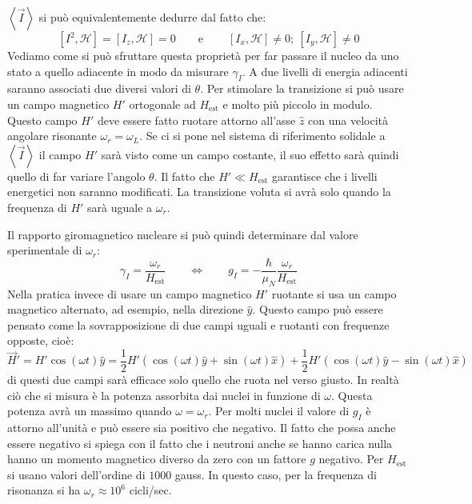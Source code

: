 $\left\langle \vec{I} \right\rangle$ si può equivalentemente dedurre dal fatto
che:
\begin{equation}
\left[ I^2, \mathcal{H} \right] = \left[ I_z, \mathcal{H} \right] = 0 \qquad \text{e}\ \qquad \left[ I_x, \mathcal{H} \right] \ne 0;\ \left[ I_y, \mathcal{H} \right] \ne 0
\end{equation}
Vediamo come si può sfruttare questa proprietà per far passare il nucleo da uno
stato a quello adiacente in modo da misurare $\gamma_I$. A due livelli di
energia adiacenti saranno associati due diversi valori di $\theta$. Per
stimolare la transizione si può usare un campo magnetico $H'$ ortogonale ad
$H_\text{est}$ e molto più piccolo in modulo. Questo campo $H'$ deve essere
fatto ruotare attorno all'asse $\hat{z}$ con una velocità angolare risonante
$\omega_r = \omega_L$. Se ci si pone nel sistema di riferimento solidale a
$\left\langle \vec{I} \right\rangle$ il campo $H'$ sarà visto come un campo
costante, il suo effetto sarà quindi quello di far variare l'angolo $\theta$. Il
fatto che $H' \ll H_\text{est}$ garantisce che i livelli energetici non saranno
modificati. La transizione voluta si avrà solo quando la frequenza di $H'$ sarà
uguale a $\omega_r$.

Il rapporto giromagnetico nucleare  si può quindi determinare dal valore
sperimentale di $\omega_r$:
\begin{equation}
\gamma_I = \frac{\omega_r}{H_\text{est}} \qquad \Leftrightarrow \qquad g_I = - \frac{\hbar}{\mu_N} \frac{\omega_r}{H_\text{est}}
\end{equation}
Nella pratica invece di usare un campo magnetico $H'$ ruotante si usa un campo
magnetico alternato, ad esempio, nella direzione $\hat{y}$. Questo campo può
essere pensato come la sovrapposizione di due campi uguali e ruotanti con
frequenze opposte, cioè:
\begin{equation}
\vec{H}' = H' \cos (\omega t) \hat{y} = \frac{1}{2} H' (\cos (\omega t) \hat{y} + \sin (\omega t) \hat{x} ) + \frac{1}{2} H' (\cos (\omega t) \hat{y} - \sin (\omega t) \hat{x} )
\end{equation}
di questi due campi sarà efficace solo quello che ruota nel verso giusto. In
realtà ciò che si misura è la potenza assorbita dai nuclei in funzione di
$\omega$. Questa potenza avrà un massimo quando $\omega = \omega_r$. Per molti
nuclei il valore di $g_I$ è attorno all'unità e può essere sia positivo che
negativo. Il fatto che possa anche essere negativo si spiega con il fatto che i
neutroni anche se hanno carica nulla hanno un momento magnetico diverso da zero
con un fattore $g$ negativo. Per $H_\text{est}$ si usano valori dell'ordine di
$1000$ gauss. In questo caso, per la frequenza di risonanza si ha $\omega_r
\approx 10^6$ cicli/sec.


